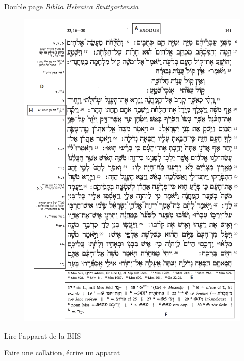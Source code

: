 \documentclass[11pt]{beamer}
\begin{document}
\begin{frame}{Double page \textit{Biblia Hebraica Stuttgartensia}}
\begin{minipage}{.45\textwidth}
\begin{figure}
        \includegraphics[width=1\linewidth]{img/BHSrecto.png}
    \end{figure}
\end{minipage}
\end{frame}


\begin{frame}{Lire l'apparat de la BHS}
    
\end{frame}



\begin{frame}{Faire une collation, écrire un apparat} 
\end{frame}
\end{document}
